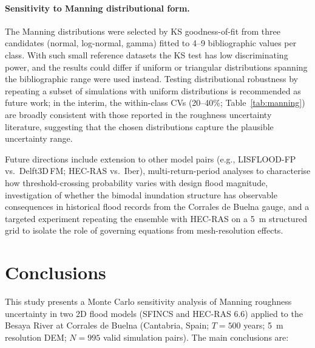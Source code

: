 \documentclass[review,12pt]{elsarticle}
\newcommand{\sfincs}{\textsc{SFINCS}}
\newcommand{\hecras}{\textsc{HEC-RAS}}
\begin{document}
\paragraph{Sensitivity to Manning distributional form.}
The Manning distributions were selected by KS goodness-of-fit from three
candidates (normal, log-normal, gamma) fitted to 4--9 bibliographic values
per class.
With such small reference datasets the KS test has low discriminating power,
and the results could differ if uniform or triangular distributions spanning
the bibliographic range were used instead.
Testing distributional robustness by repeating a subset of simulations with
uniform distributions is recommended as future work; in the interim,
the within-class CVs (20--40\%; Table~\ref{tab:manning}) are broadly
consistent with those reported in the roughness uncertainty literature,
suggesting that the chosen distributions capture the plausible uncertainty
range.

\begin{sloppypar}
Future directions include extension to other model pairs
(e.g., LISFLOOD-FP vs.\ Delft3D\,FM; \hecras{} vs.\ Iber),
multi-return-period analyses to characterise how threshold-crossing
probability varies with design flood magnitude, investigation of
whether the bimodal inundation structure has observable consequences in
historical flood records from the Corrales de Buelna gauge,
and a targeted experiment repeating the ensemble with \hecras{} on a 5~m
structured grid to isolate the role of governing equations from
mesh-resolution effects.
\end{sloppypar}

\section{Conclusions}
\label{sec:conclusions}

This study presents a Monte Carlo sensitivity analysis of Manning roughness
uncertainty in two 2D flood models (\sfincs{} and \hecras{} 6.6) applied
to the Besaya River at Corrales de Buelna (Cantabria, Spain;
$T = 500$ years; 5~m resolution DEM; $N = 995$ valid simulation pairs).
The main conclusions are:
\end{document}

